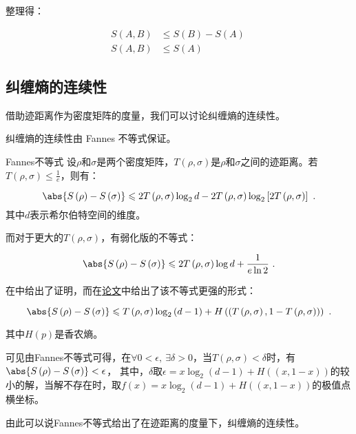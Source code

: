 整理得：

\begin{equation}
\begin{aligned}
S\left(A,B\right)&\leqslant S\left(B\right) - S\left(A\right) \\
S\left(A,B\right)&\leqslant S\left(A\right) 
\end{aligned}~
\end{equation}


\subsection{纠缠熵的连续性}

借助迹距离作为密度矩阵的度量，我们可以讨论纠缠熵的连续性。

纠缠熵的连续性由 Fannes 不等式保证。

\begin{theorem}{Fannes不等式}
设$\rho$和$\sigma$是两个密度矩阵，$T\left(\rho,\sigma\right)$是$\rho$和$\sigma$之间的迹距离。若$T\left(\rho,\sigma\right) \leqslant \frac{1}{e}$，则有：

\begin{equation}
\abs{S\left(\rho\right) - S\left(\sigma\right)} \leqslant 2T\left(\rho,\sigma\right)\log_2 d - 2T\left(\rho,\sigma\right) \log_2\left[ 2 T\left(\rho,\sigma\right)\right]~.
\end{equation}
其中$d$表示希尔伯特空间的维度。

\end{theorem}

而对于更大的$T\left(\rho,\sigma\right)$，有弱化版的不等式：

\begin{equation}
\abs{S\left(\rho\right) - S\left(\sigma\right)} \leqslant 2 T\left(\rho,\sigma\right)\log d + \frac{1}{e\ln 2}~.
\end{equation}

在\cite{量子信息}中给出了证明，而在\href{https://arxiv.org/pdf/quant-ph/0610146.pdf}{论文}中给出了该不等式更强的形式：

\begin{equation}
\abs{S\left(\rho\right) - S\left(\sigma\right)} \leqslant T\left(\rho,\sigma\right)\log_2\left(d-1\right) + H\left(\left(T\left(\rho,\sigma\right),1-T\left(\rho,\sigma\right)\right)\right)~.
\end{equation}

其中$H(p)$是香农熵。

可见由Fannes不等式可得，在$\forall 0<\epsilon,~\exists \delta>0$，当$T\left(\rho,\sigma\right)<\delta$时，有$\abs{S\left(\rho\right) - S\left(\sigma\right)}<\epsilon$，
其中，$\delta$取$\epsilon = x\log_2\left(d-1\right) + H\left(\left(x,1-x\right)\right)$的较小的解，当解不存在时，取$f(x)=x\log_2\left(d-1\right) + H\left(\left(x,1-x\right)\right)$的极值点横坐标。

由此可以说Fannes不等式给出了在迹距离的度量下，纠缠熵的连续性。